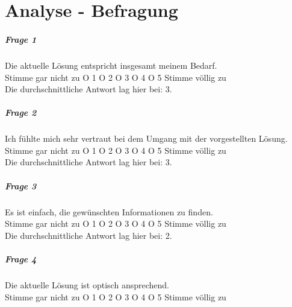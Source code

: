 \chapter{Analyse - Befragung}\label{analyse_umfrage}

\paragraph{Frage 1} Die aktuelle Lösung entspricht insgesamt meinem Bedarf. \\ 


\noindent Stimme gar nicht zu { }{ } O 1 { }{ } O 2 { }{ } O 3 { }{ } O 4 { }{ } O 5 { }{ } Stimme völlig zu \\


\noindent Die durchschnittliche Antwort lag hier bei: 3. \\


\paragraph{Frage 2} Ich fühlte mich sehr vertraut bei dem Umgang mit der vorgestellten Lösung. \\ 


\noindent Stimme gar nicht zu { }{ } O 1 { }{ } O 2 { }{ } O 3 { }{ } O 4 { }{ } O 5 { }{ } Stimme völlig zu \\


\noindent Die durchschnittliche Antwort lag hier bei: 3. \\


\paragraph{Frage 3} Es ist einfach, die gewünschten Informationen zu finden. \\ 


\noindent Stimme gar nicht zu { }{ } O 1 { }{ } O 2 { }{ } O 3 { }{ } O 4 { }{ } O 5 { }{ } Stimme völlig zu \\


\noindent Die durchschnittliche Antwort lag hier bei: 2. \\


\paragraph{Frage 4} Die aktuelle Lösung ist optisch ansprechend. \\ 


\noindent Stimme gar nicht zu { }{ } O 1 { }{ } O 2 { }{ } O 3 { }{ } O 4 { }{ } O 5 { }{ } Stimme völlig zu \\


